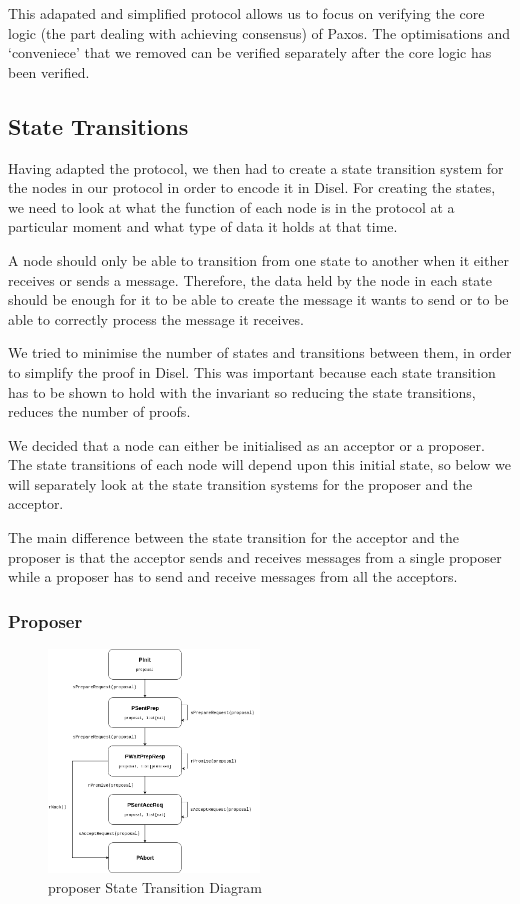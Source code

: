 This adapated and simplified protocol allows us to focus on verifying the core
logic (the part dealing with achieving consensus) of Paxos. The
optimisations and `conveniece' that we removed can be verified separately after
the core logic has been verified.


\subsection{State Transitions}
Having adapted the protocol, we then had to create a state transition system for
the nodes in our protocol in order to encode it in Disel. For creating the states,
we need to look at what the function of each node is in the protocol at a particular
moment and what type of data it holds at that time.

A node should only be able to transition from one state to another when it either
receives or sends a message. Therefore, the data held by the node in each state
should be enough for it to be able to create the message it wants to send or to
be able to correctly process the message it receives.

We tried to minimise the number of states and transitions between them, in order
to simplify the proof in Disel. This was important because each state transition
has to be shown to hold with the invariant so reducing the state transitions,
reduces the number of proofs.

We decided that a node can either be initialised as an acceptor or a proposer.
The state transitions of each node will depend upon this initial state, so below
we will separately look at the state transition systems for the proposer and the
acceptor.

The main difference between the state transition for the acceptor and the proposer
is that the acceptor sends and receives messages from a single proposer while a
proposer has to send and receive messages from all the acceptors.


\subsubsection{Proposer}
\begin{figure}
\centering
\includegraphics[width=0.5\textwidth]{figures/proposer_state_transitions.png}
\caption{proposer State Transition Diagram
\label{fig:myInlineFigure}}
\end{figure}

